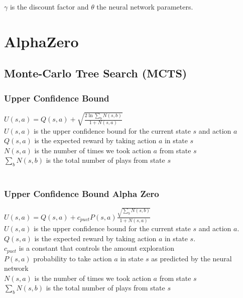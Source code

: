 \documentclass{article}
\begin{document}
\noindent $\gamma$ is the discount factor and $\theta$ the neural network parameters.

\pagebreak




\section{AlphaZero}
\subsection{Monte-Carlo Tree Search (MCTS)}
\subsubsection{Upper Confidence Bound}
$ U(s,a) = Q(s,a) + \sqrt{\frac{2\ln{\sum\nolimits_{b}N(s,b)}}{1 + N(s,a)}}$ \\

\noindent
$U(s,a)$ is the upper confidence bound for the current state $s$ and action $a$ \\
$Q(s,a)$ is the expected reward by taking action $a$ in state $s$ \\
$N(s,a)$ is the number of times we took action $a$ from state $s$ \\
$\sum\nolimits_{b}N(s,b)$ is the total number of plays from state $s$ \\
\\


\subsubsection{Upper Confidence Bound Alpha Zero}
\noindent 
$ U(s,a) = Q(s,a) + c_{puct} P(s,a) \frac{\sqrt{\sum\nolimits_{b}N(s,b)}}{1 + N(s,a)}$ \\

\noindent 
$U(s,a)$ is the upper confidence bound for the current state $s$ and action $a$. \\
$Q(s,a)$ is the expected reward by taking action $a$ in state $s$. \\
$c_{puct}$ is a constant that controls the amount exploration \\ 
$P(s,a)$ probability to take action $a$ in state $s$ as predicted by the neural network \\
$N(s,a)$ is the number of times we took action $a$ from state $s$ \\
$\sum\nolimits_{b}N(s,b)$ is the total number of plays from state $s$ \\
\\
\pagebreak
\end{document}
